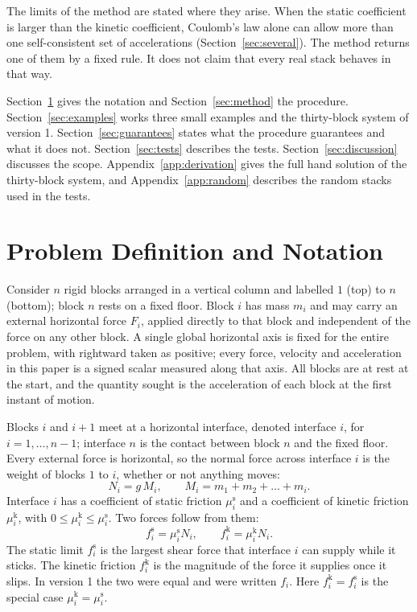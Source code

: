 \documentclass[11pt,a4paper]{article}
\newcommand{\fs}{f^{\mathrm{s}}}
\newcommand{\fkin}{f^{\mathrm{k}}}
\newcommand{\mus}{\mu^{\mathrm{s}}}
\newcommand{\muk}{\mu^{\mathrm{k}}}
\begin{document}
The limits of the method are stated where they arise. When the static coefficient is larger than the kinetic coefficient, Coulomb's law alone can allow more than one self-consistent set of accelerations (Section~\ref{sec:several}). The method returns one of them by a fixed rule. It does not claim that every real stack behaves in that way.

Section~\ref{sec:notation} gives the notation and Section~\ref{sec:method} the procedure. Section~\ref{sec:examples} works three small examples and the thirty-block system of version 1. Section~\ref{sec:guarantees} states what the procedure guarantees and what it does not. Section~\ref{sec:tests} describes the tests. Section~\ref{sec:discussion} discusses the scope. Appendix~\ref{app:derivation} gives the full hand solution of the thirty-block system, and Appendix~\ref{app:random} describes the random stacks used in the tests.

\section{Problem Definition and Notation}\label{sec:notation}

Consider $n$ rigid blocks arranged in a vertical column and labelled $1$ (top) to $n$ (bottom); block $n$ rests on a fixed floor. Block $i$ has mass $m_i$ and may carry an external horizontal force $F_i$, applied directly to that block and independent of the force on any other block. A single global horizontal axis is fixed for the entire problem, with rightward taken as positive; every force, velocity and acceleration in this paper is a signed scalar measured along that axis. All blocks are at rest at the start, and the quantity sought is the acceleration of each block at the first instant of motion.

Blocks $i$ and $i+1$ meet at a horizontal interface, denoted interface $i$, for $i=1,\dots,n-1$; interface $n$ is the contact between block $n$ and the fixed floor. Every external force is horizontal, so the normal force across interface $i$ is the weight of blocks $1$ to $i$, whether or not anything moves:
\[
N_i=g\,M_i,\qquad M_i=m_1+m_2+\dots+m_i .
\]
Interface $i$ has a coefficient of static friction $\mus_i$ and a coefficient of kinetic friction $\muk_i$, with $0\le\muk_i\le\mus_i$. Two forces follow from them:
\[
\fs_i=\mus_i N_i,\qquad \fkin_i=\muk_i N_i .
\]
The static limit $\fs_i$ is the largest shear force that interface $i$ can supply while it sticks. The kinetic friction $\fkin_i$ is the magnitude of the force it supplies once it slips. In version 1 the two were equal and were written $f_i$. Here $\fkin_i=\fs_i$ is the special case $\muk_i=\mus_i$.
\end{document}
